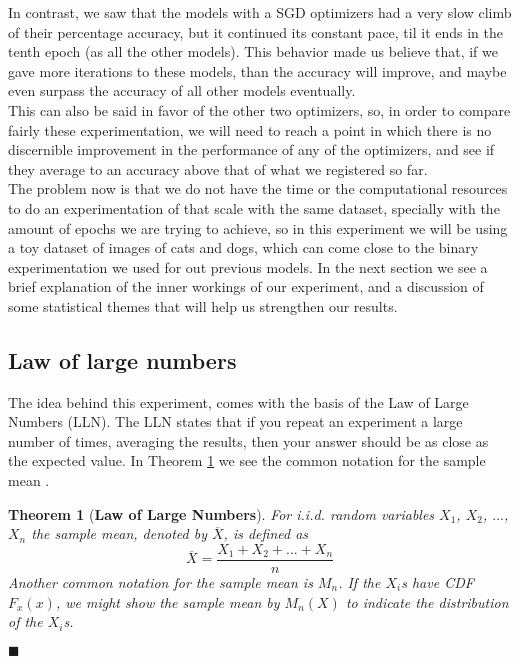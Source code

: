 \documentclass[review]{elsarticle}
\newtheorem{theorem}{Theorem}[section]
\begin{document}
In contrast, we saw that the models with a SGD optimizers had a very slow climb of their percentage accuracy, but it continued its constant pace, til it ends in the tenth epoch (as all the other models). This behavior made us believe that, if we gave more iterations to these models, than the accuracy will improve, and maybe even surpass the accuracy of all other models eventually.\\

This can also be said in favor of the other two optimizers, so, in order to compare fairly these experimentation, we will need to reach a point in which there is no discernible improvement in the performance of any of the optimizers, and see if they average to an accuracy above that of what we registered so far.\\

The problem now is that we do not have the time or the computational resources to do an experimentation of that scale with the same dataset, specially with the amount of epochs we are trying to achieve, so in this experiment we will be using a toy dataset of images of cats and dogs, which can come close to the binary experimentation we used for out previous models. In the next section we see a brief explanation of the inner workings of our experiment, and a discussion of some statistical themes that will help us strengthen our results.\\

\subsection{Law of large numbers}
The idea behind this experiment, comes with the basis of the Law of Large Numbers (LLN). The LLN states that if you repeat an experiment a large number of times, averaging the results, then your answer should be as close as the expected value. In Theorem \ref{lln} we see the common notation for the sample mean \cite{lawln}.\\

\begin{theorem}[\textbf{Law of Large Numbers}]
\label{lln}
For i.i.d. random variables $X_1$, $X_2$, $...$, $X_n$ the sample mean, denoted by $\overline{X}$, is defined as
\[\overline{X} = \frac{X_1+ X_2 + ... + X_n}{n}\]
Another common notation for the sample mean is $M_n$. If the $X_i$s have CDF $F_x(x)$, we might show the sample mean by $M_n(X)$ to indicate the distribution of the $X_i$s.
\end{theorem}
\begin{flushright}
$\blacksquare$
\end{flushright}
\end{document}
